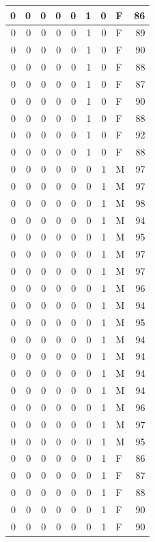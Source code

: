 \documentclass[
  12pt,
]{krantz}
\begin{document}
\begin{tabular}{r|r|r|r|r|r|r|l|r}
\hline
0 & 0 & 0 & 0 & 0 & 1 & 0 & F & 86\\
\hline
0 & 0 & 0 & 0 & 0 & 1 & 0 & F & 89\\
\hline
0 & 0 & 0 & 0 & 0 & 1 & 0 & F & 90\\
\hline
0 & 0 & 0 & 0 & 0 & 1 & 0 & F & 88\\
\hline
0 & 0 & 0 & 0 & 0 & 1 & 0 & F & 87\\
\hline
0 & 0 & 0 & 0 & 0 & 1 & 0 & F & 90\\
\hline
0 & 0 & 0 & 0 & 0 & 1 & 0 & F & 88\\
\hline
0 & 0 & 0 & 0 & 0 & 1 & 0 & F & 92\\
\hline
0 & 0 & 0 & 0 & 0 & 1 & 0 & F & 88\\
\hline
0 & 0 & 0 & 0 & 0 & 0 & 1 & M & 97\\
\hline
0 & 0 & 0 & 0 & 0 & 0 & 1 & M & 97\\
\hline
0 & 0 & 0 & 0 & 0 & 0 & 1 & M & 98\\
\hline
0 & 0 & 0 & 0 & 0 & 0 & 1 & M & 94\\
\hline
0 & 0 & 0 & 0 & 0 & 0 & 1 & M & 95\\
\hline
0 & 0 & 0 & 0 & 0 & 0 & 1 & M & 97\\
\hline
0 & 0 & 0 & 0 & 0 & 0 & 1 & M & 97\\
\hline
0 & 0 & 0 & 0 & 0 & 0 & 1 & M & 96\\
\hline
0 & 0 & 0 & 0 & 0 & 0 & 1 & M & 94\\
\hline
0 & 0 & 0 & 0 & 0 & 0 & 1 & M & 95\\
\hline
0 & 0 & 0 & 0 & 0 & 0 & 1 & M & 94\\
\hline
0 & 0 & 0 & 0 & 0 & 0 & 1 & M & 94\\
\hline
0 & 0 & 0 & 0 & 0 & 0 & 1 & M & 94\\
\hline
0 & 0 & 0 & 0 & 0 & 0 & 1 & M & 94\\
\hline
0 & 0 & 0 & 0 & 0 & 0 & 1 & M & 96\\
\hline
0 & 0 & 0 & 0 & 0 & 0 & 1 & M & 97\\
\hline
0 & 0 & 0 & 0 & 0 & 0 & 1 & M & 95\\
\hline
0 & 0 & 0 & 0 & 0 & 0 & 1 & F & 86\\
\hline
0 & 0 & 0 & 0 & 0 & 0 & 1 & F & 87\\
\hline
0 & 0 & 0 & 0 & 0 & 0 & 1 & F & 88\\
\hline
0 & 0 & 0 & 0 & 0 & 0 & 1 & F & 90\\
\hline
0 & 0 & 0 & 0 & 0 & 0 & 1 & F & 90\\

\end{tabular}
\end{document}
